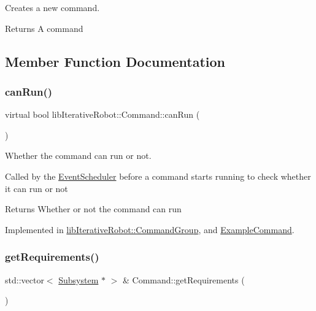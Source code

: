 Creates a new command. 

\begin{DoxyReturn}{Returns}
A command 
\end{DoxyReturn}


\subsection{Member Function Documentation}
\mbox{\label{classlib_iterative_robot_1_1_command_aebef0fdf029a15ee48fbb778c4265609}} 
\subsubsection{\texorpdfstring{canRun()}{canRun()}}
{\footnotesize\ttfamily virtual bool lib\+Iterative\+Robot\+::\+Command\+::can\+Run (\begin{DoxyParamCaption}{ }\end{DoxyParamCaption})\hspace{0.3cm}{\ttfamily [pure virtual]}}



Whether the command can run or not. 

Called by the \mbox{\hyperlink{classlib_iterative_robot_1_1_event_scheduler}{Event\+Scheduler}} before a command starts running to check whether it can run or not \begin{DoxyReturn}{Returns}
Whether or not the command can run 
\end{DoxyReturn}


Implemented in \mbox{\hyperlink{classlib_iterative_robot_1_1_command_group_abd75c9b52e6b4ae5af1b6724e865311f}{lib\+Iterative\+Robot\+::\+Command\+Group}}, and \mbox{\hyperlink{class_example_command_ad1df0170d99bcef6c6bc1676551f9539}{Example\+Command}}.

\mbox{\label{classlib_iterative_robot_1_1_command_a447ba6e394f165c6d358471a8bbdc76a}} 
\subsubsection{\texorpdfstring{getRequirements()}{getRequirements()}}
{\footnotesize\ttfamily std\+::vector$<$ \mbox{\hyperlink{classlib_iterative_robot_1_1_subsystem}{Subsystem}} $\ast$ $>$ \& Command\+::get\+Requirements (\begin{DoxyParamCaption}{ }\end{DoxyParamCaption})\hspace{0.3cm}{\ttfamily [protected]}}



